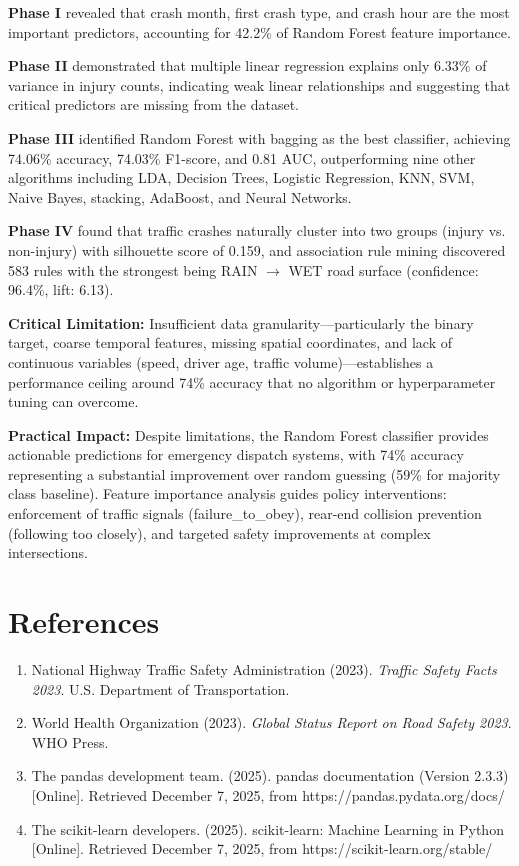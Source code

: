\documentclass[stu,12pt,floatsintext]{apa7}
\begin{document}
\textbf{Phase I} revealed that crash month, first crash type, and crash hour are the most important predictors, 
accounting for 42.2\% of Random Forest feature importance.

\textbf{Phase II} demonstrated that multiple linear regression explains only 6.33\% of variance in injury counts, indicating 
weak linear relationships and suggesting that critical predictors are missing from the dataset.

\textbf{Phase III} identified Random Forest with bagging as the best classifier, achieving 74.06\% accuracy, 74.03\% F1-score, 
and 0.81 AUC, outperforming nine other algorithms including LDA, Decision Trees, Logistic Regression, KNN, SVM, Naive Bayes, 
stacking, AdaBoost, and Neural Networks.

\textbf{Phase IV} found that traffic crashes naturally cluster into two groups (injury vs. non-injury) with silhouette score 
of 0.159, and association rule mining discovered 583 rules with the strongest being RAIN $\rightarrow$ WET road surface 
(confidence: 96.4\%, lift: 6.13).

\textbf{Critical Limitation:} Insufficient data granularity—particularly the binary target, coarse temporal features, 
missing spatial coordinates, and lack of continuous variables (speed, driver age, traffic volume)—establishes a performance 
ceiling around 74\% accuracy that no algorithm or hyperparameter tuning can overcome.

\textbf{Practical Impact:} Despite limitations, the Random Forest classifier provides actionable predictions for 
emergency dispatch systems, with 74\% accuracy representing a substantial improvement over random guessing (59\% for 
majority class baseline). Feature importance analysis guides policy interventions: enforcement of traffic signals 
(failure\_to\_obey), rear-end collision prevention (following too closely), and targeted safety improvements at 
complex intersections.

\section{References}

\begin{enumerate}
    \item National Highway Traffic Safety Administration (2023). \textit{Traffic Safety Facts 2023}. U.S. Department of Transportation.
    \item World Health Organization (2023). \textit{Global Status Report on Road Safety 2023}. WHO Press.
    \item The pandas development team. (2025). pandas documentation (Version 2.3.3) [Online]. Retrieved December 7, 2025, from https://pandas.pydata.org/docs/
    \item The scikit-learn developers. (2025). scikit-learn: Machine Learning in Python [Online]. Retrieved December 7, 2025, from https://scikit-learn.org/stable/
\end{enumerate}
\end{document}
